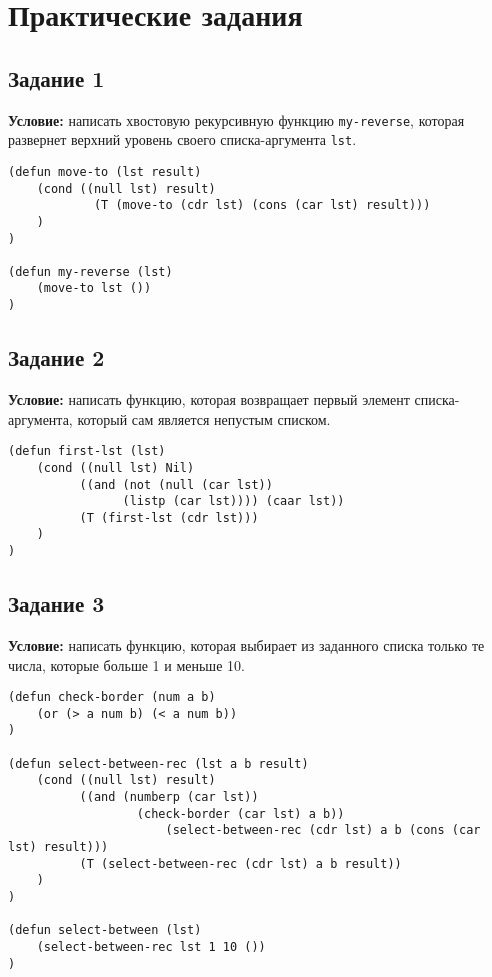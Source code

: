 \chapter{Практические задания}

\section{Задание 1}

\textbf{Условие:} написать хвостовую рекурсивную функцию \texttt{my-reverse}, которая развернет верхний уровень своего списка-аргумента \texttt{lst}.

\begin{lstlisting}    
(defun move-to (lst result)
    (cond ((null lst) result)
            (T (move-to (cdr lst) (cons (car lst) result)))
    )
)

(defun my-reverse (lst)
    (move-to lst ())
)
\end{lstlisting}


\section{Задание 2}

\textbf{Условие:} написать функцию, которая возвращает первый элемент списка-аргумента, который сам является непустым списком.


\begin{lstlisting}
(defun first-lst (lst)
    (cond ((null lst) Nil)
          ((and (not (null (car lst))
                (listp (car lst)))) (caar lst))
          (T (first-lst (cdr lst)))
    )
)
\end{lstlisting}


\section{Задание 3}

\textbf{Условие:} написать функцию, которая выбирает из заданного списка только те числа, которые больше 1 и меньше 10.


\begin{lstlisting}
(defun check-border (num a b)
    (or (> a num b) (< a num b))
)

(defun select-between-rec (lst a b result)
    (cond ((null lst) result)
          ((and (numberp (car lst)) 
                  (check-border (car lst) a b)) 
                      (select-between-rec (cdr lst) a b (cons (car lst) result)))
          (T (select-between-rec (cdr lst) a b result))
    )
)

(defun select-between (lst)
    (select-between-rec lst 1 10 ())
)
\end{lstlisting}


